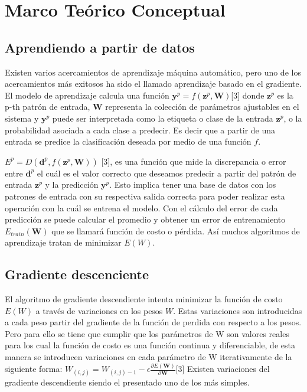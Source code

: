 \chapter{Marco Teórico Conceptual}


\section{Aprendiendo a partir de datos}
Existen varios acercamientos de aprendizaje máquina automático, pero uno de los acercamientos más exitosos ha sido el llamado aprendizaje basado en el gradiente. El modelo de aprendizaje calcula una función $\mathbf{y}^p=f\left(\mathbf{z}^p,\mathbf{W}\right)$[3] donde $\mathbf{z}^p$ es la p-th patrón de entrada, $\mathbf{W}$ representa la colección de parámetros ajustables en el sistema y  $\mathbf{y}^p$ puede ser interpretada como la etiqueta o clase de la entrada $\mathbf{z}^p$, o la probabilidad asociada a cada clase a predecir. Es decir que a partir de una entrada se predice la clasificación deseada por medio de una función $f$.

$E^p=D\left(\mathbf{d}^p,f\left(\mathbf{z}^p,\mathbf{W}\right)\right)$ [3], es una función que mide la discrepancia o error entre $\mathbf{d}^p$ el cuál es el valor correcto que deseamos predecir a partir del patrón de entrada $\mathbf{z}^p$ y la predicción $\mathbf{y}^p$. Esto implica tener una base de datos con los patrones de entrada con su respectiva salida correcta para poder realizar esta operación con la cuál se entrena el modelo. Con el cálculo del error de cada predicción se puede calcular el promedio y obtener un error de entrenamiento $E_{train}\left(\mathbf{W}\right)$ que se llamará función de costo o pérdida. Así muchos algoritmos de aprendizaje tratan de minimizar $E\left(W\right)$. 


\section{Gradiente descenciente}
El algoritmo de gradiente descendiente intenta minimizar la función de costo $E\left(W\right)$ a través de variaciones en los pesos $W$. Estas variaciones son introducidas a cada peso partir del gradiente de la función de perdida con respecto a los pesos. Pero para ello se tiene que cumplir que los parámetros de W son valores reales para los cual la función de costo es una función continua y diferenciable, de esta manera se introducen variaciones en cada parámetro de W iterativamente de la siguiente forma:
$W_{(i,j)}=W_{(i,j)-1}-\epsilon\frac{\partial E\left(\mathbf{W}\right)}{\partial \mathbf{W}}$[3]
Existen variaciones del gradiente descendiente siendo el presentado uno de los más simples.

